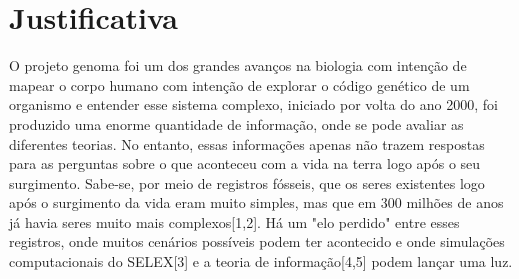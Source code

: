 \section{Justificativa}

O projeto genoma foi um dos grandes avanços na biologia com intenção de mapear o
corpo humano com intenção de explorar o código genético de um organismo e entender
esse sistema complexo, iniciado por volta do ano 2000, foi produzido uma enorme
quantidade de informação, onde se pode avaliar as diferentes teorias. No entanto, essas
informações apenas não trazem respostas para as perguntas sobre o que aconteceu com a
vida na terra logo após o seu surgimento. Sabe-se, por meio de registros fósseis, que os
seres existentes logo após o surgimento da vida eram muito simples, mas que em 300
milhões de anos já havia seres muito mais complexos[1,2]. Há um "elo perdido" entre
esses registros, onde muitos cenários possíveis podem ter acontecido e onde simulações
computacionais do SELEX[3] e a teoria de informação[4,5] podem lançar uma luz.